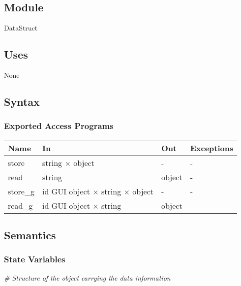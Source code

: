 \documentclass[12pt, titlepage]{article}
\begin{document}
\subsection{Module}
DataStruct
\subsection{Uses}
None
\subsection{Syntax}

\subsubsection{Exported Access Programs}

\begin{center}
\begin{tabular}{p{4cm} p{4cm} p{4cm} p{2cm}}
\hline
\textbf{Name} & \textbf{In} & \textbf{Out} & \textbf{Exceptions} \\
\hline
store & string $\times$ object & - & - \\
read & string & object & - \\
store{\_}g & id GUI object $\times$ string $\times$ object & - & - \\
read{\_}g & id GUI object $\times$ string & object & - \\
\hline
\end{tabular}
\end{center}

\subsection{Semantics}

\subsubsection{State Variables}

\noindent\textit{{\#} Structure of the object carrying the data information}\medskip
\end{document}
